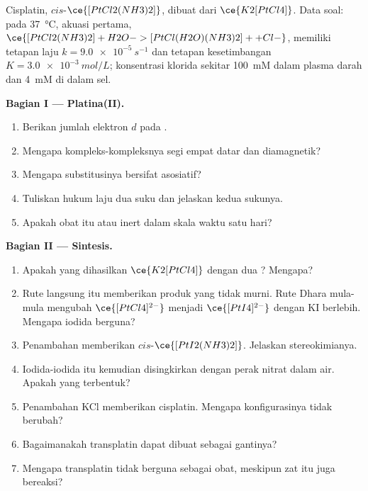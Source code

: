 \begin{problem}
\label{pb:b3:complex-mechanisms:1}
Cisplatin, $cis$-$\ce{[PtCl2(NH3)2]}$, dibuat dari $\ce{K2[PtCl4]}$. Data soal: pada
\qty{37}{\celsius}, akuasi pertama, $\ce{[PtCl2(NH3)2] + H2O -> [PtCl(H2O)(NH3)2]+ + Cl-}$, memiliki
tetapan laju $k = \qty{9.0e-5}{s^{-1}}$ dan tetapan kesetimbangan $K = \qty{3.0e-3}{mol/L}$; konsentrasi
klorida sekitar \qty{100}{mM} dalam plasma darah dan \qty{4}{mM} di dalam sel.

\medskip\noindent\textbf{Bagian I --- Platina(II).}
\begin{enumerate}[beginpenalty=10000]
  \item Berikan jumlah elektron $d$ pada .
  \item Mengapa kompleks-kompleksnya segi empat datar dan diamagnetik?
  \item Mengapa substitusinya bersifat asosiatif?
  \item Tuliskan hukum laju dua suku dan jelaskan kedua sukunya.
  \item Apakah obat itu  atau inert dalam skala waktu satu hari?
\end{enumerate}

\medskip\noindent\textbf{Bagian II --- Sintesis.}
\begin{enumerate}[resume, beginpenalty=10000]
  \item Apakah yang dihasilkan $\ce{K2[PtCl4]}$ dengan dua ? Mengapa?
  \item Rute langsung itu memberikan produk yang tidak murni. Rute Dhara mula-mula mengubah
        $\ce{[PtCl4]^{2-}}$ menjadi $\ce{[PtI4]^{2-}}$ dengan KI berlebih. Mengapa iodida berguna?
  \item Penambahan  memberikan $cis$-$\ce{[PtI2(NH3)2]}$. Jelaskan stereokimianya.
  \item Iodida-iodida itu kemudian disingkirkan dengan perak nitrat dalam air. Apakah yang terbentuk?
  \item Penambahan KCl memberikan cisplatin. Mengapa konfigurasinya tidak berubah?
  \item Bagaimanakah transplatin dapat dibuat sebagai gantinya?
  \item Mengapa transplatin tidak berguna sebagai obat, meskipun zat itu juga bereaksi?
\end{enumerate}


\end{problem}
